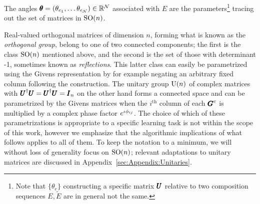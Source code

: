 \documentclass[superscriptaddress,floatfix]{article}
\begin{document}
The angles
${\pmb{\theta}} = (\theta_{e_1}, \ldots \theta_{e_{\mathcal{N}}}) \in \mathbb{R}^{\mathcal{N}}$
associated with $E$ are the parameters\footnote{Note that
  $\{\theta_e\}$ constructing a specific matrix ${\pmb{U}}$ relative to two
  composition sequences $E, \tilde{E}$ are in general not the same.}
tracing out the set of matrices in $\textrm{SO}(n)$.


Real-valued orthogonal matrices of dimension $n$, forming what is
known as the \emph{orthogonal group}, belong to one of two connected
components; the first is the class $\textrm{SO}(n)$ mentioned above, and the
second is the set of those with determinant -1, sometimes known as
\emph{reflections}. This latter class can easily be parametrized using
the Givens representation by for example negating an arbitrary fixed
column following the construction. The unitary group $\textrm{U}(n)$ of
complex matrices with ${\pmb{U}}^\dagger{\pmb{U}} = {\pmb{U}}^\dagger{\pmb{U}} = {\pmb{I}}_n$ on the
other hand forms a connected space and can be parametrized by the
Givens matrices when the $i^{\textrm{th}}$ column of each ${\pmb{G}}^e$ is
multiplied by a complex phase factor $e^{\iota\phi_{ij}}$. The choice
of which of these parametrizations is appropriate to a specific
learning task is not within the scope of this work, however we
emphasize that the algorithmic implications of what follows applies to
all of them. To keep the notation to a minimum, we will without loss
of generality focus on $\textrm{SO}(n)$; relevant adaptations to unitary
matrices are discussed in Appendix~\ref{sec:Appendix:Unitaries}.
\end{document}

